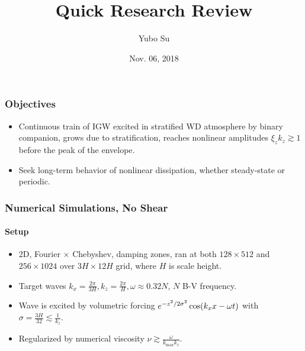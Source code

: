 \documentclass[dvipsnames]{beamer}
\DeclarePairedDelimiter\p{\lparen}{\rparen}
\begin{document}
\title{Quick Research Review}
\author{Yubo Su}
\date{Nov. 06, 2018}

\maketitle

\begin{frame}
    \frametitle{Objectives}

    \begin{itemize}
        \item Continuous train of IGW excited in stratified WD atmosphere by
            binary companion, grows due to stratification, reaches nonlinear
            amplitudes $\xi_z k_z \gtrsim 1$ before the peak of the envelope.

        \item Seek long-term behavior of nonlinear dissipation, whether
            steady-state or periodic.
    \end{itemize}
\end{frame}

\begin{frame}
    \frametitle{Numerical Simulations, No Shear}
    \framesubtitle{Setup}

    \begin{itemize}
        \item 2D, Fourier $\times$ Chebyshev, damping zones, ran at both $128
            \times 512$ and $256 \times 1024$ over $3H \times 12H$ grid, where
            $H$ is scale height.

        \item Target waves $k_x = \frac{2\pi}{3H}, k_z = \frac{2\pi}{H}, \omega
            \approx 0.32N$, $N$ B-V frequency.

        \item Wave is excited by volumetric forcing
            $e^{-z^2/2\sigma^2}\cos\p*{k_xx - \omega t}$ with $\sigma =
            \frac{3H}{32} \lesssim \frac{1}{k_z}$.

        \item Regularized by numerical viscosity $\nu \gtrsim
            \frac{\omega}{k_{\max}k_z}$.
    \end{itemize}
\end{frame}
\end{document}
